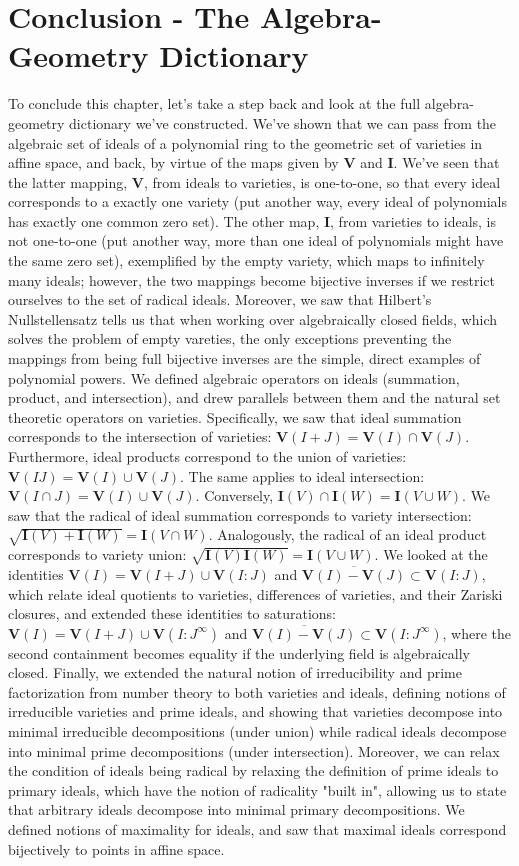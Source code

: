 \documentclass{article}
\newcommand*{\nn}{\newline \newline}
\newcommand*{\V}{\ensuremath{\mathbf{V}}}
\newcommand*{\I}{\ensuremath{\mathbf{I}}}
\begin{document}
\section{Conclusion - The Algebra-Geometry Dictionary}
To conclude this chapter, let's take a step back and look at the full algebra-geometry dictionary we've constructed. We've shown that we can pass from the algebraic set of ideals of a polynomial ring to the geometric set of varieties in affine space, and back, by virtue of the maps given by $ \V $ and $ \I $.
\nn
We've seen that the latter mapping, $ \V $, from ideals to varieties, is one-to-one, so that every ideal corresponds to a exactly one variety (put another way, every ideal of polynomials has exactly one common zero set). The other map, $ \I $, from varieties to ideals, is not one-to-one (put another way, more than one ideal of polynomials might have the same zero set), exemplified by the empty variety, which maps to infinitely many ideals; however, the two mappings become bijective inverses if we restrict ourselves to the set of radical ideals. Moreover, we saw that Hilbert's Nullstellensatz tells us that when working over algebraically closed fields, which solves the problem of empty vareties, the only exceptions preventing the mappings from being full bijective inverses are the simple, direct examples of polynomial powers.
\nn
We defined algebraic operators on ideals (summation, product, and intersection), and drew parallels between them and the natural set theoretic operators on varieties. Specifically, we saw that ideal summation corresponds to the intersection of varieties: $ \V(I + J) = \V(I) \cap \V(J) $. Furthermore, ideal products correspond to the union of varieties: $ \V(I J) = \V(I) \cup \V(J) $. The same applies to ideal intersection: $ \V(I \cap J) = \V(I) \cup \V(J) $. Conversely, $ \I(V) \cap \I(W) = \I(V \cup W) $. We saw that the radical of ideal summation corresponds to variety intersection: $ \sqrt{\I(V) + \I(W)} = \I(V \cap W) $. Analogously, the radical of an ideal product corresponds to variety union: $ \sqrt{\I(V) \I(W)} = \I(V \cup W) $.
\nn
We looked at the identities $ \V(I) = \V(I + J) \cup \V(I : J) $ and $ \overline{\V(I) - \V(J)} \subset \V(I : J) $, which relate ideal quotients to varieties, differences of varieties, and their Zariski closures, and extended these identities to saturations: $ \V(I) = \V(I + J) \cup \V(I : J^\infty) $ and $ \overline{\V(I) - \V(J)} \subset \V(I : J^\infty) $, where the second containment becomes equality if the underlying field is algebraically closed.
\nn
Finally, we extended the natural notion of irreducibility and prime factorization from number theory to both varieties and ideals, defining notions of irreducible varieties and prime ideals, and showing that varieties decompose into minimal irreducible decompositions (under union) while radical ideals decompose into minimal prime decompositions (under intersection). Moreover, we can relax the condition of ideals being radical by relaxing the definition of prime ideals to primary ideals, which have the notion of radicality "built in", allowing us to state that arbitrary ideals decompose into minimal primary decompositions. We defined notions of maximality for ideals, and saw that maximal ideals correspond bijectively to points in affine space.
\end{document}
